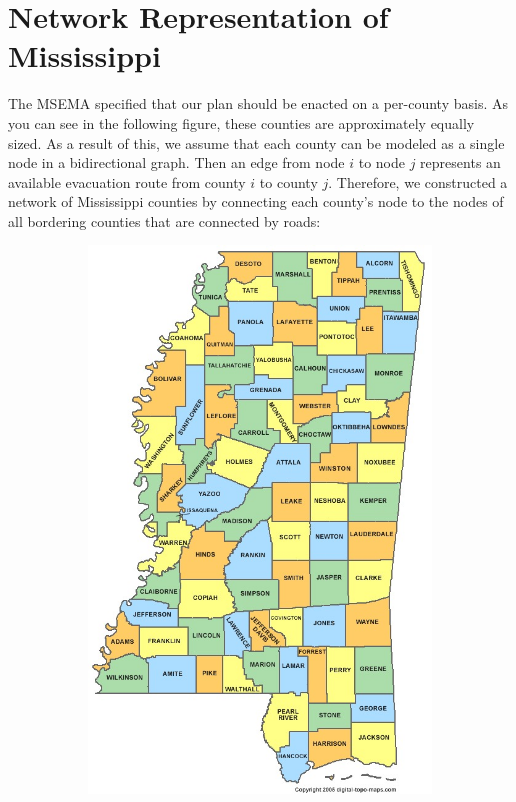 \documentclass[titlepage]{article}
\begin{document}
\section{Network Representation of Mississippi}
\label{sec:representation}
  \par
    The MSEMA specified that our plan should be enacted on a per-county basis. As you can see in the following figure, these counties are approximately equally sized. As a result of this, we assume that each county can be modeled as a single node in a bidirectional graph. Then an edge from node $i$ to node $j$ represents an available evacuation route from county $i$ to county $j$. Therefore, we constructed a network of Mississippi counties by connecting each county's node to the nodes of all bordering counties that are connected by roads:
  \begin{figure}[H]
    \center
    \begin{subfigure}[b]{0.5\textwidth}
      \center
      \includegraphics[width=.9\linewidth]{figures/county_map.jpg}

\end{subfigure}
\end{figure}
\end{document}
